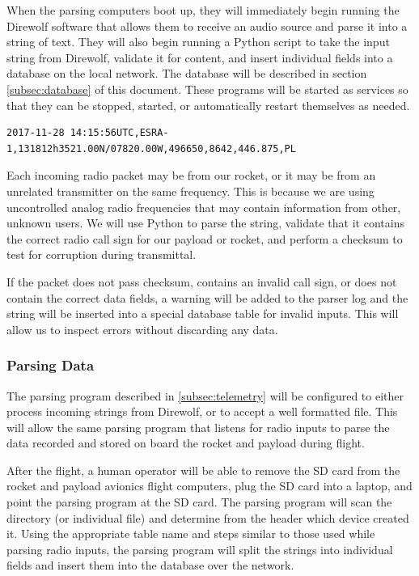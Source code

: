 \documentclass[onecolumn, draftclsnofoot, 10pt, compsoc]{IEEEtran}
\begin{document}
When the parsing computers boot up, they will immediately begin running the Direwolf software that allows them to receive an audio source and parse it into a string of text.\cite{direwolf}  They will also begin running a Python script to take the input string from Direwolf, validate it for content, and insert individual fields into a database on the local network.  The database will be described in section \ref{subsec:database} of this document.  These programs will be started as services so that they can be stopped, started, or automatically restart themselves as needed.\cite{script-as-service}\\

\begin{lstlisting}[frame=single]
2017-11-28 14:15:56UTC,ESRA-1,131812h3521.00N/07820.00W,496650,8642,446.875,PL
\end{lstlisting}
\label{example-aprs}

Each incoming radio packet may be from our rocket, or it may be from an unrelated transmitter on the same frequency.  This is because we are using uncontrolled analog radio frequencies that may contain information from other, unknown users.  We will use Python to parse the string, validate that it contains the correct radio call sign for our payload or rocket, and perform a checksum to test for corruption during transmittal.

If the packet does not pass checksum, contains an invalid call sign, or does not contain the correct data fields, a warning will be added to the parser log and the string will be inserted into a special database table for invalid inputs.  This will allow us to inspect errors without discarding any data.

\subsubsection{Parsing Data}

The parsing program described in \ref{subsec:telemetry} will be configured to either process incoming strings from Direwolf, or to accept a well formatted file.  This will allow the same parsing program that listens for radio inputs to parse the data recorded and stored on board the rocket and payload during flight.

After the flight, a human operator will be able to remove the SD card from the rocket and payload avionics flight computers, plug the SD card into a laptop, and point the parsing program at the SD card.  The parsing program will scan the directory (or individual file) and determine from the header which device created it.  Using the appropriate table name and steps similar to those used while parsing radio inputs, the parsing program will split the strings into individual fields and insert them into the database over the network.\\
\end{document}
